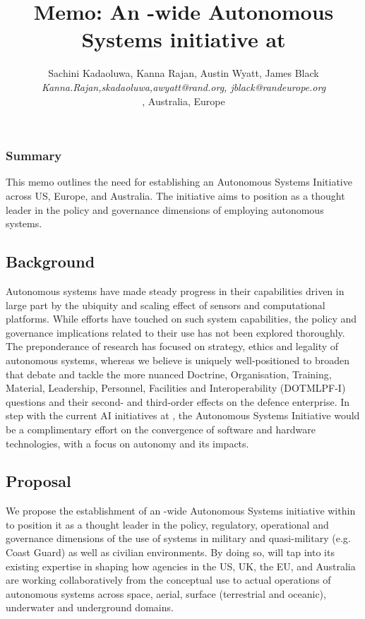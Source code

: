 \documentclass[11pt,letterpaper]{article}
\title{Memo: An \auke-wide Autonomous Systems initiative at \org}
\author{\textsf{\large{Sachini Kadaoluwa, Kanna Rajan, Austin Wyatt,
      James Black}}\\
  \emph{{Kanna.Rajan,skadaoluwa,awyatt}@rand.org, jblack@randeurope.org}\\
  \orge, \org Australia, \org Europe
  }
\begin{document}
\maketitle{}

\subsubsection{Summary}

This memo outlines the need for establishing an Autonomous Systems
Initiative across \org US, Europe, and Australia. The initiative aims
to position \org as a thought leader in the policy and governance
dimensions of employing autonomous systems.

\subsection{Background}

Autonomous systems have made steady progress in their capabilities
driven in large part by the ubiquity and scaling effect of sensors and
computational platforms. While \org efforts have touched on such
system capabilities, the policy and governance implications related to
their use has not been explored thoroughly. The preponderance of
research has focused on strategy, ethics and legality of autonomous
systems, whereas we believe \org is uniquely well-positioned to
broaden that debate and tackle the more nuanced Doctrine,
Organisation, Training, Material, Leadership, Personnel, Facilities
and Interoperability (DOTMLPF-I) questions and their second- and
third-order effects on the defence enterprise. In step with the
current AI initiatives at \org, the Autonomous Systems Initiative
would be a complimentary effort on the convergence of software and
hardware technologies, with a focus on autonomy and its impacts.


\subsection{Proposal}

We propose the establishment of an \auke-wide Autonomous Systems
initiative within \org to position it as a thought leader in the
policy, regulatory, operational and governance dimensions of the use
of systems in military and quasi-military (e.g. Coast Guard) as well
as civilian environments. By doing so, \org will tap into its existing
expertise in shaping how agencies in the US, UK, the EU, and Australia
are working collaboratively from the conceptual use to actual
operations of autonomous systems across space, aerial, surface
(terrestrial and oceanic), underwater and underground domains.
\end{document}
